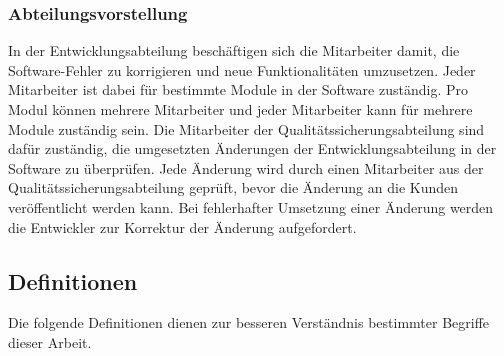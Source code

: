 \subsubsection{Abteilungsvorstellung}
In der Entwicklungsabteilung beschäftigen sich die Mitarbeiter damit, die Software-Fehler zu korrigieren und neue Funktionalitäten umzusetzen. Jeder Mitarbeiter ist dabei für bestimmte Module in der Software zuständig. Pro Modul können mehrere Mitarbeiter und jeder Mitarbeiter kann für mehrere Module zuständig sein. Die Mitarbeiter der Qualitätssicherungsabteilung sind dafür zuständig, die umgesetzten Änderungen der Entwicklungsabteilung in der Software zu überprüfen. Jede Änderung wird durch einen Mitarbeiter aus der Qualitätssicherungsabteilung geprüft, bevor die Änderung an die Kunden veröffentlicht werden kann. Bei fehlerhafter Umsetzung einer Änderung werden die Entwickler zur Korrektur der Änderung aufgefordert.

\subsection{Definitionen}
Die folgende Definitionen dienen zur besseren Verständnis bestimmter Begriffe dieser Arbeit.

